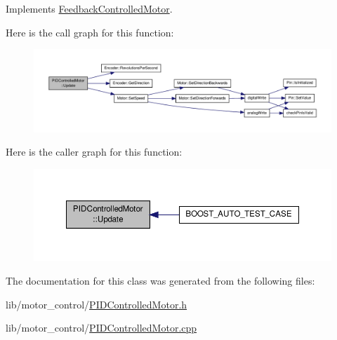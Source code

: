 Implements \hyperlink{class_feedback_controlled_motor_a54668f85a8dadb66971ee8c8a76be802}{Feedback\-Controlled\-Motor}.



Here is the call graph for this function\-:
\nopagebreak
\begin{figure}[H]
\begin{center}
\leavevmode
\includegraphics[width=350pt]{class_p_i_d_controlled_motor_a7ab5288c0d1df6540475634c9a150df2_cgraph}
\end{center}
\end{figure}




Here is the caller graph for this function\-:\nopagebreak
\begin{figure}[H]
\begin{center}
\leavevmode
\includegraphics[width=350pt]{class_p_i_d_controlled_motor_a7ab5288c0d1df6540475634c9a150df2_icgraph}
\end{center}
\end{figure}




The documentation for this class was generated from the following files\-:\begin{DoxyCompactItemize}
\item 
lib/motor\-\_\-control/\hyperlink{_p_i_d_controlled_motor_8h}{P\-I\-D\-Controlled\-Motor.\-h}\item 
lib/motor\-\_\-control/\hyperlink{_p_i_d_controlled_motor_8cpp}{P\-I\-D\-Controlled\-Motor.\-cpp}\end{DoxyCompactItemize}
